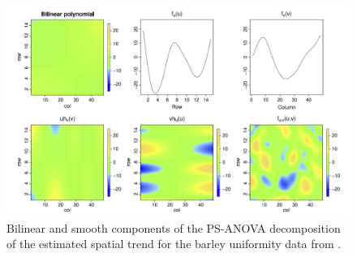 \begin{figure}[hbtp]
\centering
\includegraphics[width=\textwidth]{../figures/bilinear_polynomial.PNG}
\caption[Bilinear and smooth components of the PS-ANOVA decomposition]{Bilinear and smooth components of the PS-ANOVA decomposition of the estimated spatial trend for the barley uniformity
data from \textcite{rodriguez-alvarez_correcting_2018}.}
\label{fig:bilinear_and_smooth_decomposition}
\end{figure}


